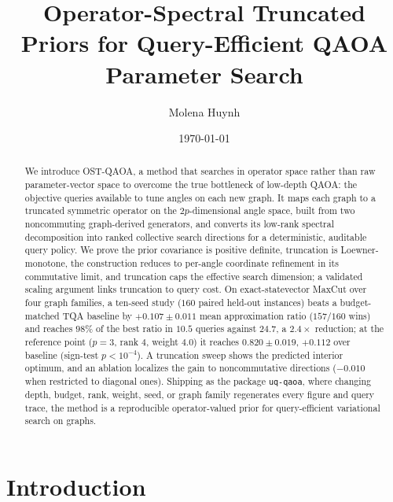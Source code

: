 \documentclass[aps,prresearch,reprint,amsmath,amssymb,floatfix,nofootinbib,superscriptaddress,longbibliography]{revtex4-2}
\theoremstyle{remark}
\newcommand{\QAOA}{\textnormal{\textsc{QAOA}}}
\newcommand{\OSTQAOA}{\textnormal{\textsc{OST-QAOA}}}
\newcommand{\TQA}{\textnormal{\textsc{TQA}}}
\begin{document}
\title{Operator-Spectral Truncated Priors for Query-Efficient QAOA Parameter Search}

\author{Molena Huynh}

\date{\today}

\begin{abstract}
We introduce \OSTQAOA{}, a method that searches in operator space rather than
raw parameter-vector space to overcome the true bottleneck of low-depth \QAOA{}:
the objective queries available to tune angles on each new graph.  It maps each
graph to a truncated symmetric operator on the \(2p\)-dimensional angle space,
built from two noncommuting graph-derived generators, and converts its low-rank
spectral decomposition into ranked collective search directions for a
deterministic, auditable query policy.  We prove the prior covariance is positive
definite, truncation is Loewner-monotone, the construction reduces to
per-angle coordinate refinement in its commutative limit, and truncation caps the
effective search dimension; a validated scaling argument links truncation to
query cost.  On exact-statevector MaxCut over four graph families, a ten-seed
study (\(160\) paired held-out instances) beats a budget-matched \TQA{} baseline
by \(+0.107\pm0.011\) mean approximation ratio (\(157/160\) wins) and reaches
\(98\%\) of the best ratio in \(10.5\) queries against \(24.7\), a \(2.4\times\)
reduction; at the reference point (\(p{=}3\), rank \(4\), weight \(4.0\)) it
reaches \(0.820\pm0.019\), \(+0.112\) over baseline (sign-test \(p<10^{-4}\)).  A
truncation sweep shows the predicted interior optimum, and an ablation localizes
the gain to noncommutative directions (\(-0.010\) when restricted to diagonal
ones).  Shipping as the package \texttt{uq-qaoa}, where changing depth, budget,
rank, weight, seed, or graph family regenerates every figure and query trace, the
method is a reproducible operator-valued prior for query-efficient variational
search on graphs.
\end{abstract}

\maketitle

\section{Introduction}
\end{document}

